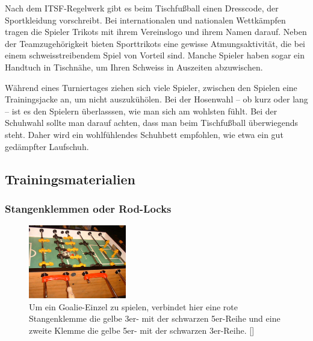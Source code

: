 Nach dem ITSF-Regelwerk gibt es beim Tischfußball einen Dresscode, der Sportkleidung vorschreibt. 
Bei internationalen und nationalen Wettkämpfen tragen die Spieler Trikots mit ihrem Vereinslogo und ihrem Namen darauf. 
Neben der Teamzugehörigkeit bieten Sporttrikots eine gewisse Atmungsaktivität, die bei einem schweisstreibendem Spiel von Vorteil sind. 
Manche Spieler haben sogar ein Handtuch in Tischnähe, um Ihren Schweiss in Auszeiten abzuwischen.

Während eines Turniertages ziehen sich viele Spieler, zwischen den Spielen eine Trainingsjacke an, um nicht auszukühölen.
Bei der Hosenwahl -- ob kurz oder lang -- ist es den Spielern überlasssen, wie man sich am wohlsten fühlt. 
Bei der Schuhwahl sollte man darauf achten, dass man beim Tischfußball überwiegends steht. 
Daher wird ein wohlfühlendes Schuhbett empfohlen, wie etwa ein gut gedämpfter Laufschuh.  

\subsection{Trainingsmaterialien}
\label{tisch:zubehoer:training}

\subsubsection{Stangenklemmen oder Rod-Locks}
\label{tisch:zubehoer:training:rodlock}

\begin{figure}
\centering 
\includegraphics[width=0.38\textwidth]{img/rodlock_goalie.jpg} 
\caption{Um ein Goalie-Einzel zu spielen, verbindet hier eine rote Stangenklemme die gelbe 3er- mit der schwarzen 5er-Reihe und eine zweite Klemme die gelbe 5er- mit der schwarzen 3er-Reihe. [\cite{www:rod-lock}]} 
\label{fig:rod-lock} 
\end{figure}

